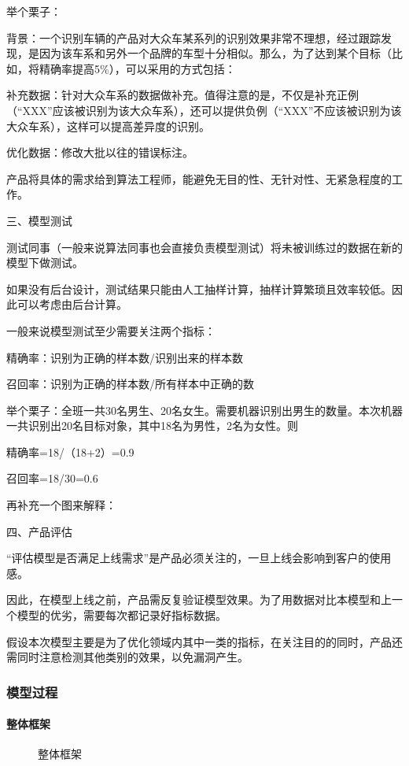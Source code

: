 \documentclass[letterpaper,10pt,english]{sphinxmanual}
\begin{document}
举个栗子：

背景：一个识别车辆的产品对大众车某系列的识别效果非常不理想，经过跟踪发现，是因为该车系和另外一个品牌的车型十分相似。那么，为了达到某个目标（比如，将精确率提高5\%），可以采用的方式包括：

补充数据：针对大众车系的数据做补充。值得注意的是，不仅是补充正例（“XXX”应该被识别为该大众车系），还可以提供负例（“XXX”不应该被识别为该大众车系），这样可以提高差异度的识别。

优化数据：修改大批以往的错误标注。

产品将具体的需求给到算法工程师，能避免无目的性、无针对性、无紧急程度的工作。

三、模型测试

测试同事（一般来说算法同事也会直接负责模型测试）将未被训练过的数据在新的模型下做测试。

如果没有后台设计，测试结果只能由人工抽样计算，抽样计算繁琐且效率较低。因此可以考虑由后台计算。

一般来说模型测试至少需要关注两个指标：

精确率：识别为正确的样本数/识别出来的样本数

召回率：识别为正确的样本数/所有样本中正确的数

举个栗子：全班一共30名男生、20名女生。需要机器识别出男生的数量。本次机器一共识别出20名目标对象，其中18名为男性，2名为女性。则

精确率=18/（18+2）=0.9

召回率=18/30=0.6

再补充一个图来解释：

四、产品评估

“评估模型是否满足上线需求”是产品必须关注的，一旦上线会影响到客户的使用感。

因此，在模型上线之前，产品需反复验证模型效果。为了用数据对比本模型和上一个模型的优劣，需要每次都记录好指标数据。

假设本次模型主要是为了优化领域内其中一类的指标，在关注目的的同时，产品还需同时注意检测其他类别的效果，以免漏洞产生。


\subsubsection{模型过程}
\label{\detokenize{chapter_project/Model Process:id1}}\label{\detokenize{chapter_project/Model Process::doc}}

\paragraph{整体框架}
\label{\detokenize{chapter_project/Model Process:id2}}
\begin{figure}[H]
\centering
\capstart

\noindent{}
\caption{整体框架}\label{\detokenize{chapter_project/Model Process:id11}}\end{figure}
\end{document}
